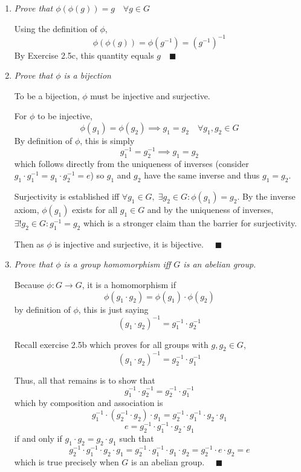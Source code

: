 \documentclass[12pt]{article}
\newcommand{\qed}{\quad \blacksquare}
\begin{document}
\begin{enumerate}[label=(\alph*)]
    \item \emph{Prove that $\phi(\phi(g)) = g \quad \forall g \in G$}
    
    \color{blue}
    Using the definition of $\phi$, 
    \[\phi(\phi(g)) = \phi(g^{-1}) = (g^{-1})^{-1}\]
    By Exercise 2.5c, this quantity equals $g \qed$ 
    \color{black}

    \item \emph{Prove that $\phi$ is a bijection}
    
    \color{blue}
    To be a bijection, $\phi$ must be injective and surjective. 

    For $\phi$ to be injective, 
    \[\phi(g_1) = \phi(g_2) \implies g_1 = g_2 \quad \forall g_1, g_2 \in G\]
    By definition of $\phi$, this is simply
    \[g_1^{-1} = g_2^{-1} \implies g_1 = g_2\]
    which follows directly from the uniqueness of inverses (consider $g_1 \cdot g_1^{-1} = g_1\cdot g_2^{-1} = e$) so $g_1$ and $g_2$ have the same inverse and thus $g_1 = g_2.$

    Surjectivity is established iff $\forall g_1 \in G, \; \exists g_2 \in G : \phi(g_1) = g_2$. By the inverse axiom, $\phi(g_1)$ exists for all $g_1 \in G$ and by the uniqueness of inverses, $\exists ! g_2 \in G: g_1^{-1} = g_2$ which is a stronger claim than the barrier for surjectivity. 

    Then as $\phi$ is injective and surjective, it is bijective. $\qed$

    \color{black}
    \item \emph{Prove that $\phi$ is a group homomorphism iff $G$ is an abelian group.}
    
    \color{blue}
    Because $\phi: G \to G$, it is a homomorphism if 
    \[\phi(g_1 \cdot g_2) = \phi(g_1) \cdot \phi(g_2)\]
    by definition of $\phi$, this is just saying
    \[(g_1 \cdot g_2)^{-1} = g_1^{-1} \cdot g_2^{-1}\]

    Recall exercise 2.5b which proves for all groups with $g, g_2 \in G$, 
    \[(g_1 \cdot g_2)^{-1} = g_2^{-1} \cdot g_1^{-1}\]

    Thus, all that remains is to show that 
    \[g_1^{-1} \cdot g_2^{-1} = g_2^{-1} \cdot g_1^{-1}\]
    which by composition and association is 
    \[g_1^{-1} \cdot (g_2^{-1} \cdot g_2) \cdot g_1 = g_2^{-1} \cdot g_1^{-1} \cdot g_2 \cdot g_1\]
    \[e = g_2^{-1} \cdot g_1^{-1} \cdot g_2 \cdot g_1 \]
    if and only if $g_1 \cdot g_2 = g_2 \cdot g_1$ such that 
    \[g_2^{-1} \cdot g_1^{-1} \cdot g_2 \cdot g_1 = g_2^{-1} \cdot g_1^{-1} \cdot g_1 \cdot g_2 = g_2^{-1} \cdot e \cdot g_2 = e\]
    which is true precisely when $G$ is an abelian group. $\qed$
\end{enumerate}
\end{document}
